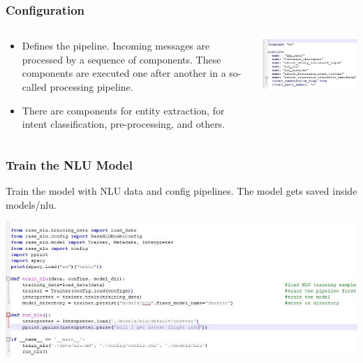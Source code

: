  \begin{frame}[fragile]\frametitle{Configuration}
 
    \begin{columns}
    \begin{column}[t]{0.5\linewidth}
\begin{itemize}
\item Defines the pipeline. Incoming messages are processed by a sequence of components. These components are executed one after another in a so-called processing pipeline. 
\item There are components for entity extraction, for intent classification, pre-processing, and others. 
\end{itemize}
\end{column}
    \begin{column}[t]{0.5\linewidth}
\begin{center}
\includegraphics[width=\linewidth,keepaspectratio]{images/mmt2}
\end{center}
\end{column}
\end{columns}
\end{frame}

 \begin{frame}[fragile]\frametitle{Train the NLU Model}
 Train the model with NLU data and config pipelines. The model gets saved inside models/nlu.

\begin{center}
\includegraphics[width=\linewidth,keepaspectratio]{images/mmt3}
\end{center}

\end{frame}

